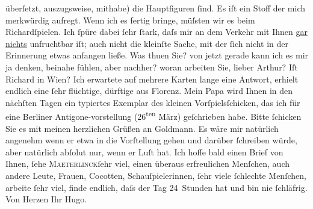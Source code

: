 \begin{ledgroupsized}[t]{13cm}
               überſetzt, auszugsweise, mithabe) die Hauptfiguren ſind. Es iſt ein Stoff der mich
               merkwürdig aufregt. Wenn ich es fertig bringe, müſsten wir es beim Richardſpielen. Ich ſpüre dabei ſehr ſtark, daſs mir an
               dem Verkehr mit Ihnen \uline{gar}{ }\uline{nichts} unfruchtbar iſt; auch nicht die kleinſte
               Sache, mit der ſich nicht in der {\pb}Erinnerung etwas anfangen ließe.\pend
           \pstart
           Was thuen Sie? von \label{K_L01021_2v}\label{K_L01021_2h} jetzt
               gerade kann ich es mir ja denken, beinahe fühlen, aber nachher? woran arbeiten Sie,
               lieber Arthur?\pend
           \pstart
           Iſt Richard in Wien? Ich erwartete auf mehrere Karten lange eine Antwort, erhielt endlich
               eine ſehr {\pb}flüchtige, dürftige aus
                  Florenz.\pend
           \pstart
           Mein Papa wird Ihnen in den
               nächſten Tagen ein typiertes Exemplar des kleinen Vorſpielsſchicken, das ich für eine Berliner Antigone-vorstellung
                     (26\textsuperscript{ten} März) geſchrieben habe. Bitte
               ſchicken Sie es mit meinen herzlichen Grüßen an Goldmann. Es wäre mir natürlich angenehm {\pb}wenn er etwa in die Vorſtellung
               gehen und darüber ſchreiben würde, aber natürlich abſolut nur, wenn er Luſt hat.\pend
           \pstart
           Ich hoffe bald einen Brief von Ihnen, ſehe \textsc{Maeterlinck}ſehr viel, einen überaus erfreulichen Menſchen,
               auch andere Leute, Frauen, Cocotten, Schauſpielerinnen, ſehr viele ſchlechte
               Menſchen, arbeite ſehr viel, finde endlich, daſs der Tag 24 Stunden hat und bin nie
               ſchläfrig.\pend
           \pstart Von Herzen Ihr \spacefill\mbox{Hugo.}\pend{}
         

\end{ledgroupsized}
